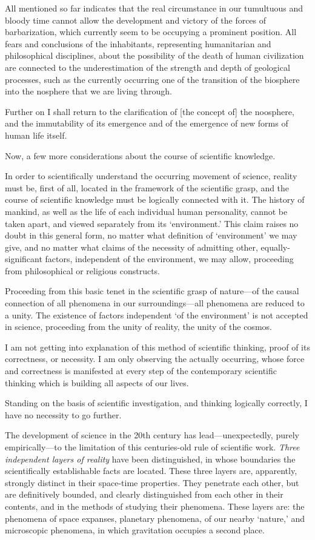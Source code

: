 All mentioned so far indicates that the real circumstance in our tumultuous and
bloody time cannot allow the development and victory of the forces of
barbarization, which currently seem to be occupying a prominent position.  All
fears and conclusions of the inhabitants, representing humanitarian and
philosophical disciplines, about the possibility of the death of human
civilization are connected to the underestimation of the strength and depth of
geological processes, such as the currently occurring one of the transition of
the biosphere into the nosphere that we are living through.

Further on I shall return to the clarification of [the concept of] the
noosphere, and the immutability of its emergence and of the emergence of new
forms of human life itself.

Now, a few more considerations about the course of scientific knowledge.


\Section %
In order to scientifically understand the occurring movement of science,
reality must be, first of all, located in the framework of the scientific
grasp, and the course of scientific knowledge must be logically connected with
it.  The history of mankind, as well as the life of each individual human
personality, cannot be taken apart, and viewed separately from its
`environment.'  This claim raises no doubt in this general form, no matter what
definition of `environment' we may give, and no matter what claims of the
necessity of admitting other, equally-significant factors, independent of the
environment, we may allow, proceeding from philosophical or religious
constructs.

Proceeding from this basic tenet in the scientific grasp of nature---of the
causal connection of all phenomena in our surroundings---all phenomena are
reduced to a unity.  The existence of factors independent `of the environment'
is not accepted in science, proceeding from the unity of reality, the unity of
the cosmos.

I am not getting into explanation of this method of scientific thinking, proof
of its correctness, or necessity.  I am only observing the actually occurring,
whose force and correctness is manifested at every step of the contemporary
scientific thinking which is building all aspects of our lives.

Standing on the basis of scientific investigation, and thinking logically
correctly, I have no necessity to go further.

The development of science in the 20th century has lead---unexpectedly, purely
empirically---to the limitation of this centuries-old rule of scientific work.
\emph{Three independent layers of reality} have been distinguished, in whose
boundaries the scientifically establishable facts are located.  These three
layers are, apparently, strongly distinct in their space-time properties.  They
penetrate each other, but are definitively bounded, and clearly distinguished
from each other in their contents, and in the methods of studying their
phenomena.  These layers are: the phenomena of space expanses, planetary
phenomena, of our nearby `nature,' and microscopic phenomena, in which
gravitation occupies a second place.

